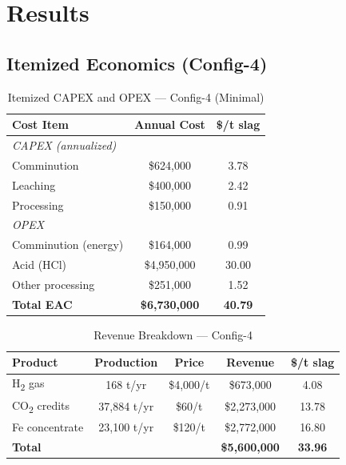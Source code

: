 \documentclass[11pt,a4paper]{article}
\begin{document}
\section{Results}

\subsection{Itemized Economics (Config-4)}

\begin{table}[H]
\centering
\caption{Itemized CAPEX and OPEX --- Config-4 (Minimal)}
\label{tab:costs}
\begin{tabular}{lcc}
\toprule
\textbf{Cost Item}          & \textbf{Annual Cost} & \textbf{\$/t slag} \\
\midrule
\multicolumn{3}{l}{\textit{CAPEX (annualized)}} \\
\quad Comminution           & \$624,000  & 3.78 \\
\quad Leaching              & \$400,000  & 2.42 \\
\quad Processing            & \$150,000  & 0.91 \\
\midrule
\multicolumn{3}{l}{\textit{OPEX}} \\
\quad Comminution (energy)  & \$164,000  & 0.99 \\
\quad Acid (HCl)            & \$4,950,000 & 30.00 \\
\quad Other processing      & \$251,000  & 1.52 \\
\midrule
\textbf{Total EAC}          & \textbf{\$6,730,000} & \textbf{40.79} \\
\bottomrule
\end{tabular}
\end{table}

\begin{table}[H]
\centering
\caption{Revenue Breakdown --- Config-4}
\label{tab:revenue}
\begin{tabular}{lcccc}
\toprule
\textbf{Product}  & \textbf{Production} & \textbf{Price} & \textbf{Revenue} & \textbf{\$/t slag} \\
\midrule
H\textsubscript{2} gas        & 168 t/yr    & \$4,000/t   & \$673,000   & 4.08 \\
CO\textsubscript{2} credits    & 37,884 t/yr & \$60/t      & \$2,273,000 & 13.78 \\
Fe concentrate  & 23,100 t/yr & \$120/t     & \$2,772,000 & 16.80 \\
\midrule
\textbf{Total}                 &             &             & \textbf{\$5,600,000} & \textbf{33.96} \\
\bottomrule
\end{tabular}
\end{table}
\end{document}
